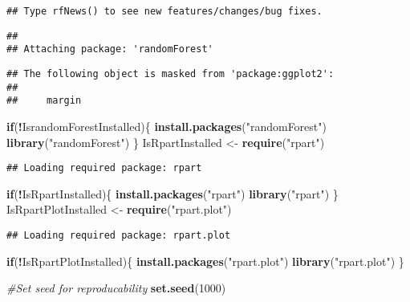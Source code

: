 \documentclass[
]{article}
\newenvironment{Shaded}{\begin{snugshade}}{\end{snugshade}}
\newcommand{\CommentTok}[1]{\textcolor[rgb]{0.56,0.35,0.01}{\textit{#1}}}
\newcommand{\ControlFlowTok}[1]{\textcolor[rgb]{0.13,0.29,0.53}{\textbf{#1}}}
\newcommand{\DecValTok}[1]{\textcolor[rgb]{0.00,0.00,0.81}{#1}}
\newcommand{\FunctionTok}[1]{\textcolor[rgb]{0.13,0.29,0.53}{\textbf{#1}}}
\newcommand{\NormalTok}[1]{#1}
\newcommand{\OtherTok}[1]{\textcolor[rgb]{0.56,0.35,0.01}{#1}}
\newcommand{\SpecialCharTok}[1]{\textcolor[rgb]{0.81,0.36,0.00}{\textbf{#1}}}
\newcommand{\StringTok}[1]{\textcolor[rgb]{0.31,0.60,0.02}{#1}}
\begin{document}
\begin{verbatim}
## Type rfNews() to see new features/changes/bug fixes.
\end{verbatim}

\begin{verbatim}
## 
## Attaching package: 'randomForest'
\end{verbatim}

\begin{verbatim}
## The following object is masked from 'package:ggplot2':
## 
##     margin
\end{verbatim}

\begin{Shaded}
\begin{Highlighting}[]
\ControlFlowTok{if}\NormalTok{(}\SpecialCharTok{!}\NormalTok{IsrandomForestInstalled)\{}
  \FunctionTok{install.packages}\NormalTok{(}\StringTok{"randomForest"}\NormalTok{)}
  \FunctionTok{library}\NormalTok{(}\StringTok{"randomForest"}\NormalTok{)}
\NormalTok{\}}
\NormalTok{IsRpartInstalled }\OtherTok{\textless{}{-}} \FunctionTok{require}\NormalTok{(}\StringTok{"rpart"}\NormalTok{)        }
\end{Highlighting}
\end{Shaded}

\begin{verbatim}
## Loading required package: rpart
\end{verbatim}

\begin{Shaded}
\begin{Highlighting}[]
\ControlFlowTok{if}\NormalTok{(}\SpecialCharTok{!}\NormalTok{IsRpartInstalled)\{}
  \FunctionTok{install.packages}\NormalTok{(}\StringTok{"rpart"}\NormalTok{)}
  \FunctionTok{library}\NormalTok{(}\StringTok{"rpart"}\NormalTok{)}
\NormalTok{\}}
\NormalTok{IsRpartPlotInstalled }\OtherTok{\textless{}{-}} \FunctionTok{require}\NormalTok{(}\StringTok{"rpart.plot"}\NormalTok{)}
\end{Highlighting}
\end{Shaded}

\begin{verbatim}
## Loading required package: rpart.plot
\end{verbatim}

\begin{Shaded}
\begin{Highlighting}[]
\ControlFlowTok{if}\NormalTok{(}\SpecialCharTok{!}\NormalTok{IsRpartPlotInstalled)\{}
  \FunctionTok{install.packages}\NormalTok{(}\StringTok{"rpart.plot"}\NormalTok{)}
  \FunctionTok{library}\NormalTok{(}\StringTok{"rpart.plot"}\NormalTok{)}
\NormalTok{\}}

\CommentTok{\#Set seed for reproducability}
\FunctionTok{set.seed}\NormalTok{(}\DecValTok{1000}\NormalTok{)}
\end{Highlighting}
\end{Shaded}
\end{document}
